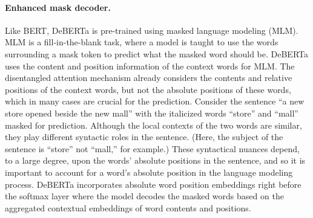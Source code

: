 \paragraph{Enhanced mask decoder.}
Like BERT, DeBERTa is pre-trained using masked language modeling (MLM). MLM is a fill-in-the-blank task, where a model is taught to use the words surrounding a mask token to predict what the masked word should be. DeBERTa uses the content and position information of the context words for MLM. The disentangled attention mechanism already considers the contents and relative positions of the context words, but not the absolute positions of these words, which in many cases are crucial for the prediction.
Consider the sentence “a new store opened beside the new mall” with the italicized words “store” and “mall” masked for prediction. Although the local contexts of the two words are similar, they play different syntactic roles in the sentence. (Here, the subject of the sentence is “store” not “mall,” for example.) These syntactical nuances depend, to a large degree, upon the words’ absolute positions in the sentence, and so it is important to account for a word’s absolute position in the language modeling process. DeBERTa incorporates absolute word position embeddings right before the softmax layer where the model decodes the masked words based on the aggregated contextual embeddings of word contents and positions.



